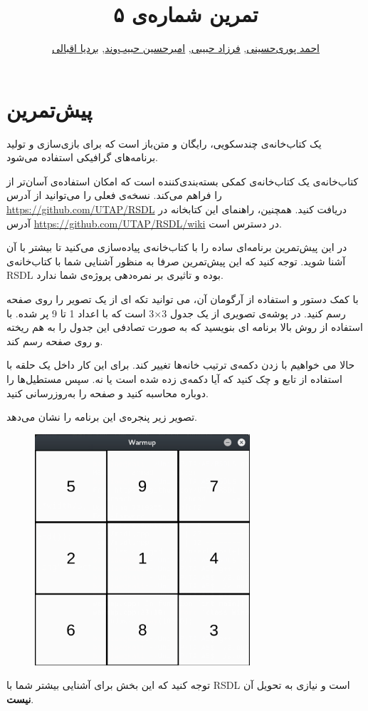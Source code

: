 \documentclass{utap}
\title{تمرین شماره‌ی ۵}
\author{
	\href{mailto:seyedahmadpourihosseini@gmail.com?subject=[AP\%20S98\%20A5]\%20}{احمد پوری‌حسینی},
	\href{mailto:farzadhabibii98@gmail.com?subject=[AP\%20S98\%20A5]\%20}{فرزاد حبیبی},
	\href{mailto:ahhabibvand@gmail.com?subject=[AP\%20S98\%20A5]\%20}{امیرحسین حبیب‌وند},
	\href{mailto:bardia.eghbali@gmail.com??subject=[AP\%20S98\%20A5]\%20}{بردیا اقبالی}
}
\begin{document}
	\maketitle

	\section{پیش‌تمرین }

  یک کتاب‌خانه‌ی چندسکویی، رایگان و متن‌باز است که برای بازی‌سازی و تولید برنامه‌های گرافیکی استفاده می‌شود.

کتاب‌خانه‌ی  یک کتاب‌خانه‌ی کمکی بسته‌بندی‌کننده است که امکان استفاده‌ی آسان‌تر از  را فراهم می‌کند.
نسخه‌ی فعلی  را می‌توانید از آدرس \url{https://github.com/UTAP/RSDL} دریافت کنید. همچنین، راهنمای این کتابخانه در آدرس \url{https://github.com/UTAP/RSDL/wiki} در دسترس است.

در این پیش‌تمرین برنامه‌ای ساده را با کتاب‌خانه‌ی  پیاده‌سازی می‌کنید تا بیشتر با آن آشنا شوید.  توجه کنید که این پیش‌تمرین صرفا به منظور آشنایی شما با کتاب‌خانه‌ی RSDL بوده و تاثیری بر نمره‌‌دهی پروژه‌ی شما ندارد.


با کمک دستور  و استفاده از آرگومان  آن، می توانید تکه ای از یک تصویر را روی صفحه رسم کنید. در پوشه‌ی  تصویری از یک جدول 3×3 است که با اعداد 1 تا 9 پر شده. با استفاده از روش بالا برنامه ای بنویسید که به صورت تصادفی این جدول را به هم ریخته و روی صفحه رسم کند.

حالا می خواهیم با زدن دکمه‌ی  ترتیب خانه‌ها تغییر کند. برای این کار داخل یک حلقه با استفاده از تابع  و  چک کنید که آیا دکمه‌ی  زده شده است یا نه. سپس مستطیل‌ها را دوباره محاسبه کنید و صفحه را به‌روزرسانی کنید.

تصویر زیر پنجره‌ی این برنامه را نشان می‌دهد.
	\begin{figure}[H]
	\begin{center}
		\includegraphics[width=8cm]{warmup.png}
	\end{center}
	\end{figure}
توجه کنید که این بخش برای آشنایی بیشتر شما با RSDL است و نیازی به تحویل آن \textbf{نیست}.
\end{document}
